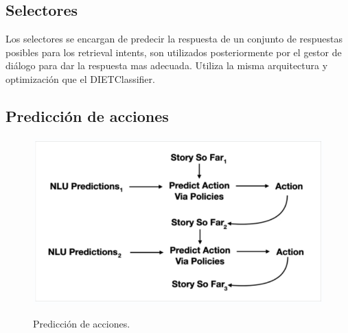 \subsection{Selectores}
Los selectores se encargan de predecir la respuesta de un conjunto de respuestas posibles para los retrieval intents, son utilizados posteriormente por el gestor de diálogo para dar la respuesta mas adecuada.
Utiliza la misma arquitectura y optimización que el DIETClassifier.


\subsection{Predicción de acciones}
\begin{figure}[h!]
    \centering
    \includegraphics[width=\textwidth]{imagenes/cap3/predicciones.png}   
    \caption{Predicción de acciones.}
    \label{fig:regex-extractor}
    \cite{Rasa}
\end{figure}

